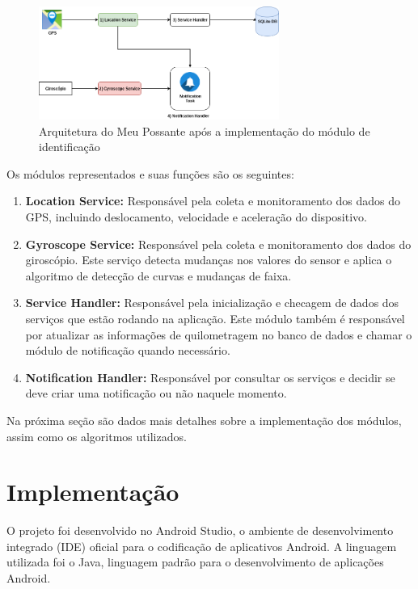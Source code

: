 \begin{figure}[h]
\centering
\includegraphics[width=0.7\textwidth]{images/arquitetura-meu-possante-com-modulo.png}
\caption{Arquitetura do Meu Possante após a implementação do módulo de identificação}
\label{arquitetura-meu-possante-com-modulo}
\end{figure}

Os módulos representados e suas funções são os seguintes:

\begin{enumerate}
  \item \textbf{Location Service:} Responsável pela coleta e monitoramento dos dados do GPS, incluindo deslocamento, velocidade e
  aceleração do dispositivo.
  \item \textbf{Gyroscope Service:} Responsável pela coleta e monitoramento dos dados do giroscópio. Este serviço detecta mudanças
  nos valores do sensor e aplica o algoritmo de detecção de curvas e mudanças de faixa.
  \item \textbf{Service Handler:} Responsável pela inicialização e checagem de dados dos serviços
  que estão rodando na aplicação. Este módulo também é responsável por atualizar as informações
  de quilometragem no banco de dados e chamar o módulo de notificação quando necessário.
  \item \textbf{Notification Handler:} Responsável por consultar os serviços e decidir se deve criar uma notificação ou não naquele
  momento.
\end{enumerate}

Na próxima seção são dados mais detalhes sobre a implementação dos módulos, assim como os algoritmos utilizados.

\section{Implementação}
\label{sec-implementacao}

O projeto foi desenvolvido no Android Studio, o ambiente de desenvolvimento integrado (IDE) oficial para o
codificação de aplicativos Android. A linguagem utilizada foi o Java, linguagem padrão para o desenvolvimento
de aplicações Android.

